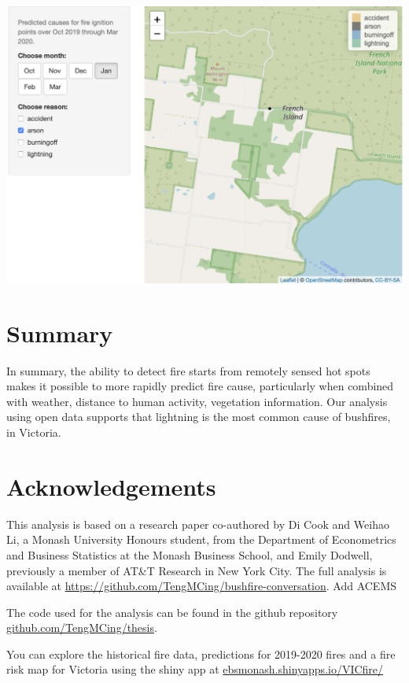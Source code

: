 \documentclass[
  11pt,
  a4paper,
]{article}
\begin{document}
\includegraphics{french_island.png}

\hypertarget{summary}{%
\section{Summary}\label{summary}}

In summary, the ability to detect fire starts from remotely sensed hot spots makes it possible to more rapidly predict fire cause, particularly when combined with weather, distance to human activity, vegetation information. Our analysis using open data supports that lightning is the most common cause of bushfires, in Victoria.

\hypertarget{acknowledgements}{%
\section{Acknowledgements}\label{acknowledgements}}

This analysis is based on a research paper co-authored by Di Cook and Weihao Li, a Monash University Honours student, from the Department of Econometrics and Business Statistics at the Monash Business School, and Emily Dodwell, previously a member of AT\&T Research in New York City. The full analysis is available at \url{https://github.com/TengMCing/bushfire-conversation}. Add ACEMS

The code used for the analysis can be found in the github repository \href{https://github.com/TengMCing/thesis}{github.com/TengMCing/thesis}.

You can explore the historical fire data, predictions for 2019-2020 fires and a fire risk map for Victoria using the shiny app at \href{https://ebsmonash.shinyapps.io/VICfire/}{ebsmonash.shinyapps.io/VICfire/}

\printbibliography
\end{document}
